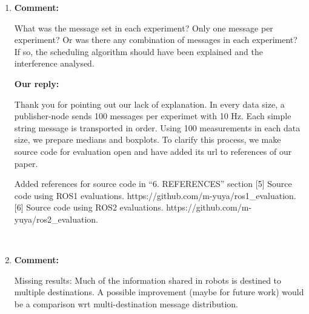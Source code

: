 \documentclass{article}
\begin{document}
\begin{enumerate}
\item \begin{flushleft}
  \textbf{Comment:}
\end{flushleft}
  What was the message set in each experiment? Only one message per experiment? Or was there any combination of messages in each experiment? If so, the scheduling algorithm should have been explained and the interference analysed.
  
  \begin{flushleft}
    \textbf{Our reply:}
  \end{flushleft}
  Thank you for pointing out our lack of explanation.
  In every data size, a publisher-node sends 100 messages per experimet with 10 Hz.
  Each simple string message is transported in order.
  Using 100 measurements in each data size, we prepare medians and boxplots.
  To clarify this process, we make source code for evaluation open and have added its url to references of our paper.
  \begin{itembox}[|]{Added references for source code in ``6. REFERENCES'' section}
    [5] Source code using ROS1 evaluations.
    https://github.com/m-yuya/ros1\_evaluation.
    [6] Source code using ROS2 evaluations.
    https://github.com/m-yuya/ros2\_evaluation.
  \end{itembox}\\

\item \begin{flushleft}
  \textbf{Comment:}
\end{flushleft}
  Missing results: Much of the information shared in robots is destined to multiple destinations. A possible improvement (maybe for future work) would be a comparison wrt multi-destination message distribution.
  

\end{enumerate}
\end{document}
